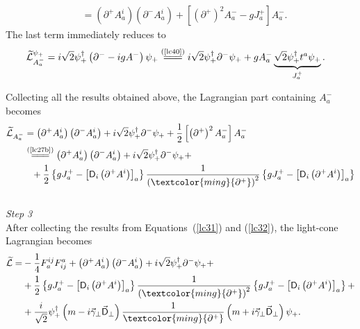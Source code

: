 \begin{note}
\begin{align*}
&=\left(\partial^+A_a^i\right)\left(\partial^-A_a^i\right)+\left[\left(\partial^+\right)^2A^-_a-gJ^+_a\right]A_a^-.
\end{align*}
The last term immediately reduces to
\begin{align*}
\widetilde{\mathcal{L}}_{A_a^-}^{\psi_+}&=i\sqrt{2}\psi_+^\dag\left(\partial^--igA^-\right)\psi_+\stackrel{(\text{\cref{lc40}})}{=\joinrel=\joinrel=}i\sqrt{2}\psi_+^\dag\partial^-\psi_++gA_a^-\underbrace{\sqrt{2}\psi_+^\dag t^a\psi_+}_{J_a^+}.
\end{align*}
\end{note}
\noindent
Collecting all the results obtained above, the Lagrangian part containing $A_a^-$ becomes
\begin{equation}\label{lc32}
\begin{aligned}
\widetilde{\mathcal{L}}_{A_a^-}&=\left(\partial^+A_a^i\right)\left(\partial^-A_a^i\right)+i\sqrt{2}\psi_+^\dag\partial^-\psi_++\frac{1}{2}\left[\left(\partial^+\right)^2A^-_a\right]A_a^-\\
&\stackrel{(\text{\cref{lc27b}})}{=\joinrel=\joinrel=}\left(\partial^+A_a^i\right)\left(\partial^-A_a^i\right)+i\sqrt{2}\psi_+^\dag\partial^-\psi_++\\
&\phantom{=}+\frac{1}{2}\left\lbrace gJ_a^+-\left[\textsf{D}_i\left(\partial^+A^i\right)\right]_a\right\rbrace\frac{1}{\left(\textcolor{ming}{\partial^+}\right)^2}\left\lbrace gJ_a^+-\left[\textsf{D}_i\left(\partial^+A^i\right)\right]_a\right\rbrace
\end{aligned}
\end{equation}
\noindent \\
{\color{ming}\textit{\sffamily Step 3}}\\ 
\noindent
After collecting the results from Equations~(\cref{lc31}) and (\cref{lc32}), the light-cone Lagrangian becomes
\begin{align*}
\widetilde{\mathcal{L}}=&-\frac{1}{4}F^{ij}_aF_{ij}^a+\left(\partial^+A_a^i\right)\left(\partial^-A_a^i\right)+i\sqrt{2}\psi_+^\dag\partial^-\psi_++\\
&+\frac{1}{2}\left\lbrace gJ_a^+-\left[\textsf{D}_i\left(\partial^+A^i\right)\right]_a\right\rbrace\frac{1}{\left(\textcolor{ming}{\partial^+}\right)^2}\left\lbrace gJ_a^+-\left[\textsf{D}_i\left(\partial^+A^i\right)\right]_a\right\rbrace+\\
&+\frac{i}{\sqrt{2}}\psi_+^\dag\left(m-i\vec{\gamma}_\perp\vec{\textsf{D}}_\perp\right)\frac{1}{\textcolor{ming}{\partial^+}}\left(m+i\vec{\gamma}_\perp\vec{\textsf{D}}_\perp\right)\psi_+.
\end{align*}

